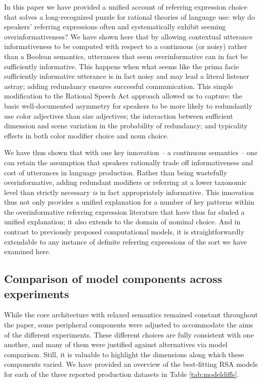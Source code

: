 \documentclass[11pt]{article}
\newcommand{\tableref}[1]{Table \ref{#1}}
\begin{document}
In this paper we have provided a unified account of referring expression choice that solves a long-recognized puzzle for rational theories of language use: why do speakers'  referring expressions often and systematically exhibit seeming overinformativeness? We have shown here that by allowing contextual utterance informativeness to be computed with respect to a continuous (or noisy) rather than a Boolean semantics, utterances that seem overinformative can in fact be sufficiently informative. This happens when what seems like the prima facie sufficiently informative utterance is in fact noisy and may lead a literal listener astray; adding redundancy ensures successful communication. This simple modification to the Rational Speech Act approach allowed us to capture: the basic well-documented asymmetry for speakers to be more likely to redundantly use color adjectives than size adjectives; the interaction between sufficient dimension and scene variation in the probability of redundancy; and typicality effects in both color modifier choice and noun choice. 

We have thus shown that with one key innovation -- a continuous semantics  -- one can retain the assumption that speakers rationally trade off informativeness and cost of utterances in language production. Rather than being wastefully overinformative, adding redundant modifiers or referring at a lower taxonomic level than strictly necessary \emph{is} in fact appropriately informative.
This innovation thus not only provides a unified explanation for a number of key patterns within the overinformative referring expression literature that have thus far eluded a unified explanation; it also extends to the domain of nominal choice. And in contrast to previously proposed computational models, it is straightforwardly extendable to any instance of definite referring expressions of the sort we have examined here. 

\subsection{Comparison of model components across experiments}

While the core architecture with relaxed semantics remained constant throughout the paper, some peripheral components were adjusted to accommodate the aims of the different experiments.
These different choices are fully consistent with one another, and many of them were justified against alternatives via model comparison.
Still, it is valuable to highlight the dimensions along which these components varied.
We have provided an overview of the best-fitting RSA models for each of the three reported production datasets in \tableref{tab:modeldiffs}. 
\end{document}
